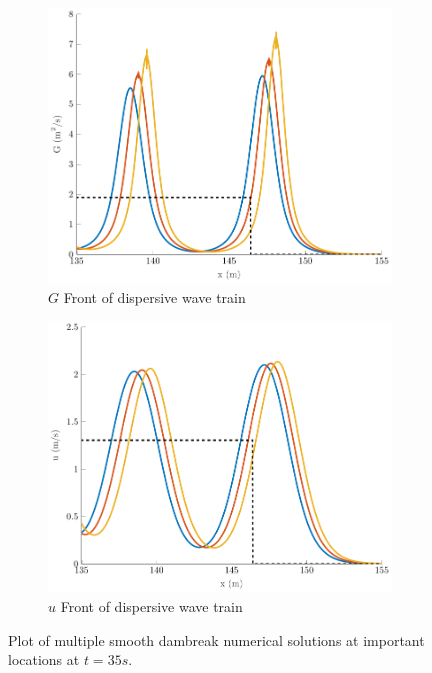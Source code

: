 \documentclass[10pt]{elsarticle}
\begin{document}
\begin{figure}
\begin{subfigure}{0.32\textwidth}
	\includegraphics[width=\textwidth]{./Figures/Simulations/Study/ImpDisp/GFront.pdf}
	\caption{$G$ Front of dispersive wave train}
	\end{subfigure}
	\begin{subfigure}{0.32\textwidth}
	\centering
	\includegraphics[width=\textwidth]{./Figures/Simulations/Study/ImpDisp/uFront.pdf}
	\caption{$u$ Front of dispersive wave train}
	\end{subfigure}

	\caption{Plot of multiple smooth dambreak numerical solutions at important locations at $t=35s$.}
\end{figure}
\end{document}
